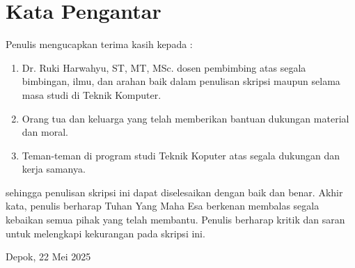 \chapter*{Kata Pengantar}
Penulis mengucapkan terima kasih kepada :
\begin{enumerate}
  \item Dr. Ruki Harwahyu, ST, MT, MSc. dosen pembimbing atas segala bimbingan, ilmu, dan arahan baik dalam penulisan skripsi maupun selama masa studi di Teknik Komputer.
  \item Orang tua dan keluarga yang telah memberikan bantuan dukungan material dan moral.
  \item Teman-teman di program studi Teknik Koputer atas segala dukungan dan kerja samanya.
\end{enumerate}

sehingga penulisan skripsi ini dapat diselesaikan dengan baik dan benar. Akhir kata, penulis  berharap Tuhan Yang Maha Esa berkenan membalas segala kebaikan semua pihak yang telah membantu. Penulis berharap kritik dan saran untuk melengkapi kekurangan pada skripsi ini.

\vspace*{0.1cm}
\begin{flushright}
	Depok, 22 Mei 2025\\[0.1cm]
	\vspace*{1cm}
	\penulis

\end{flushright}
